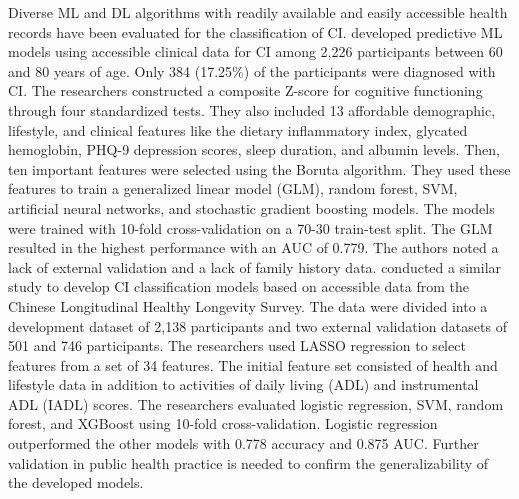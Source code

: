 Diverse ML and DL algorithms with readily available and easily accessible health records have been evaluated for the classification of CI.  developed predictive ML models using accessible clinical data for CI among 2,226 participants between 60 and 80 years of age. Only 384 (17.25\%) of the participants were diagnosed with CI. The researchers constructed a composite Z-score for cognitive functioning through four standardized tests. They also included 13 affordable demographic, lifestyle, and clinical features like the dietary inflammatory index, glycated hemoglobin, PHQ-9 depression scores, sleep duration, and albumin levels. Then, ten important features were selected using the Boruta algorithm. They used these features to train a generalized linear model (\acrshort{GLM}), random forest, SVM, artificial neural networks, and stochastic gradient boosting models. The models were trained with 10-fold cross-validation on a 70-30 train-test split. The GLM resulted in the highest performance with an AUC of 0.779. The authors noted a lack of external validation and a lack of family history data.  conducted a similar study to develop CI classification models based on accessible data from the Chinese Longitudinal Healthy Longevity Survey. The data were divided into a development dataset of 2,138 participants and two external validation datasets of 501 and 746 participants. The researchers used LASSO regression to select features from a set of 34 features. The initial feature set consisted of health and lifestyle data in addition to activities of daily living (\acrshort{ADL}) and instrumental ADL (\acrshort{IADL}) scores. The researchers evaluated logistic regression, SVM, random forest, and XGBoost using 10-fold cross-validation. Logistic regression outperformed the other models with 0.778 accuracy and 0.875 AUC. Further validation in public health practice is needed to confirm the generalizability of the developed models.

